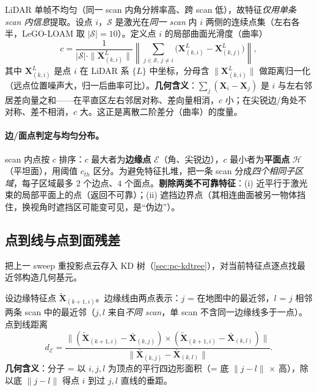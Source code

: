 \begin{derivation}[局部曲面光滑度（曲率）]
LiDAR 单帧不均匀（同一 scan 内角分辨率高、跨 scan 低），故特征\emph{仅用单条 scan 内信息}提取。设点 $i$，$\mathcal{S}$ 是激光在\emph{同一 scan} 内 $i$ 两侧的连续点集（左右各半，LeGO-LOAM 取 $|\mathcal{S}|=10$）。定义点 $i$ 的局部曲面光滑度（曲率）
\begin{equation}
  c=\frac{1}{|\mathcal{S}|\cdot\|\mathbf{X}^L_{(k,i)}\|}\left\|\sum_{j\in\mathcal{S},\,j\neq i}\Big(\mathbf{X}^L_{(k,i)}-\mathbf{X}^L_{(k,j)}\Big)\right\|,
  \label{eq:pc-loam-curv}
\end{equation}
其中 $\mathbf{X}^L_{(k,i)}$ 是点 $i$ 在 LiDAR 系 $\{L\}$ 中坐标，分母含 $\|\mathbf{X}^L_{(k,i)}\|$ 做距离归一化（远点位置噪声大，归一后曲率可比）。\textbf{几何含义}：$\sum_j(\mathbf{X}_i-\mathbf{X}_j)$ 是 $i$ 与左右邻居差向量之和——在平直区左右邻居对称、差向量相消，$c$ 小；在尖锐边/角处不对称、差不相消，$c$ 大。这正是离散二阶差分（曲率）的度量。
\end{derivation}

\paragraph{边/面点判定与均匀分布。}
scan 内点按 $c$ 排序：$c$ 最大者为\textbf{边缘点} $\mathcal{E}$（角、尖锐边），$c$ 最小者为\textbf{平面点} $\mathcal{H}$（平坦面），用阈值 $c_{th}$ 区分。为避免特征扎堆，把一条 scan 分成\emph{四个相同子区域}，每子区域最多 $2$ 个边点、$4$ 个面点。\textbf{剔除两类不可靠特征}：(i) 近平行于激光束的局部平面上的点（返回不可靠）；(ii) 遮挡边界点（其相连曲面被另一物体挡住，换视角时遮挡区可能变可见，是“伪边”）。

\subsection{点到线与点到面残差}
\label{sec:pc-loam-res}

把上一 sweep 重投影点云存入 KD 树（\cref{sec:pc-kdtree}），对当前特征点逐点找最近邻构造几何基元。

\begin{derivation}[点到边缘线距离]
设边缘特征点 $\tilde{\mathbf{X}}_{(k+1,i)}$。边缘线由两点表示：$j$ = 在地图中的最近邻，$l$ = $j$ 相邻两条 scan 中的最近邻（$j,l$ 来自\emph{不同 scan}，单 scan 不含同一边缘线多于一点）。点到线距离
\begin{equation}
  d_{\mathcal{E}}=\frac{\big\|(\tilde{\mathbf{X}}_{(k+1,i)}-\bar{\mathbf{X}}_{(k,j)})\times(\tilde{\mathbf{X}}_{(k+1,i)}-\bar{\mathbf{X}}_{(k,l)})\big\|}{\big\|\bar{\mathbf{X}}_{(k,j)}-\bar{\mathbf{X}}_{(k,l)}\big\|}.
  \label{eq:pc-loam-dE}
\end{equation}
\textbf{几何含义}：分子 = 以 $i,j,l$ 为顶点的平行四边形面积（= 底 $\|j-l\|$ $\times$ 高），除以底 $\|j-l\|$ 得点 $i$ 到过 $j,l$ 直线的垂距。
\end{derivation}

